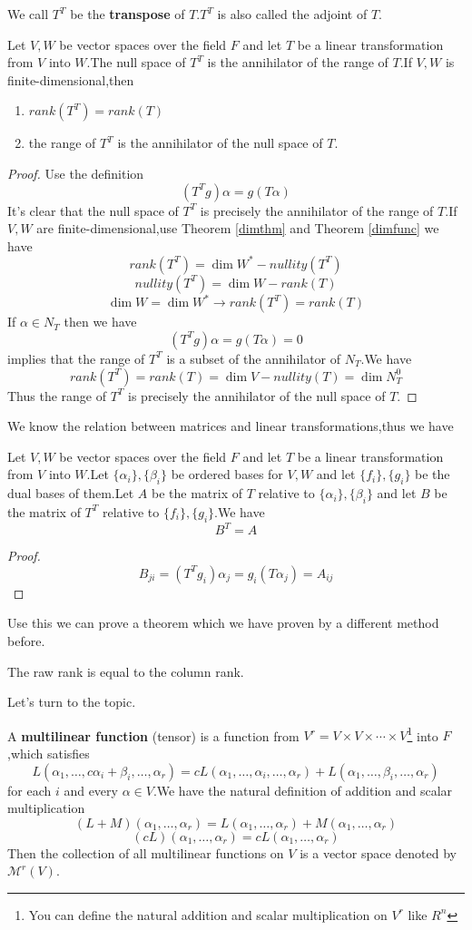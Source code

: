 \documentclass{article}
\begin{document}
We call $T^T$ be the \textbf{transpose} of $T$.$T^T$ is also called the adjoint of $T$.
\begin{thm}
	Let $V,W$ be vector spaces over the field $F$ and let $T$ be a linear transformation from $V$ into $W$.The null space of $T^T$ is the annihilator of the range of $T$.If $V,W$ is finite-dimensional,then
	\begin{enumerate}
		\item[\romannumeral1] $rank(T^T)=rank(T)$
		\item[\romannumeral2] the range of $T^T$ is the annihilator of the null space of $T$.
	\end{enumerate}
\end{thm}
\begin{proof}
	Use the definition
	\[(T^Tg)\alpha=g(T\alpha)\]
	It's clear that the null space of $T^T$ is precisely the annihilator of the range of $T$.If $V,W$ are finite-dimensional,use Theorem \ref{dimthm} and Theorem \ref{dimfunc} we have
	\[rank(T^T)=\dim W^*-nullity(T^T)\]
	\[nullity(T^T)=\dim W-rank(T)\]
	\[\dim W=\dim W^*\rightarrow rank(T^T)=rank(T)\] 
	If $\alpha\in N_T$ then we have
	\[(T^Tg)\alpha=g(T\alpha)=0\]
	implies that the range of $T^T$ is a subset of the annihilator of $N_T$.We have
	\[rank(T^T)=rank(T)=\dim V-nullity(T)=\dim N_T^0\]
	Thus the range of $T^T$ is precisely the annihilator of the null space of $T$.
\end{proof}
We know the relation between matrices and linear transformations,thus we have
\begin{thm}
	Let $V,W$ be vector spaces over the field $F$ and let $T$ be a linear transformation from $V$ into $W$.Let $\{\alpha_i\},\{\beta_i\}$ be ordered bases for $V,W$ and let $\{f_i\},\{g_i\}$ be the dual bases of them.Let $A$ be the matrix of $T$ relative to $\{\alpha_i\},\{\beta_i\}$ and let $B$ be the matrix of $T^T$ relative to $\{f_i\},\{g_i\}$.We have
	\[B^T=A\] 
\end{thm}
\begin{proof}
	\[B_{ji}=(T^Tg_i)\alpha_j=g_i(T\alpha_j)=A_{ij}\]
\end{proof}
Use this we can prove a theorem which we have proven by a different method before.
\begin{thm}
	The raw rank is equal to the column rank.
\end{thm}
Let's turn to the topic.
\begin{dde}
	A \textbf{multilinear function} (tensor) is a function from $V^r=V\times V\times\cdots\times V$\footnote{You can define the natural addition and scalar multiplication on $V^r$ like $R^n$} into $F$,which satisfies
	\[L(\alpha_1,\dots,c\alpha_i+\beta_i,\dots,\alpha_r)=cL(\alpha_1,\dots,\alpha_i,\dots,\alpha_r)+L(\alpha_1,\dots,\beta_i,\dots,\alpha_r)\]
	for each $i$ and every $\alpha\in V$.We have the natural definition of addition and scalar multiplication
	\[(L+M)(\alpha_1,\dots,\alpha_r)=L(\alpha_1,\dots,\alpha_r)+M(\alpha_1,\dots,\alpha_r)\]
	\[(cL)(\alpha_1,\dots,\alpha_r)=cL(\alpha_1,\dots,\alpha_r)\]
	Then the collection of all multilinear functions on $V$ is a vector space denoted by $\mathcal{M}^r(V)$. 
\end{dde}
\end{document}
